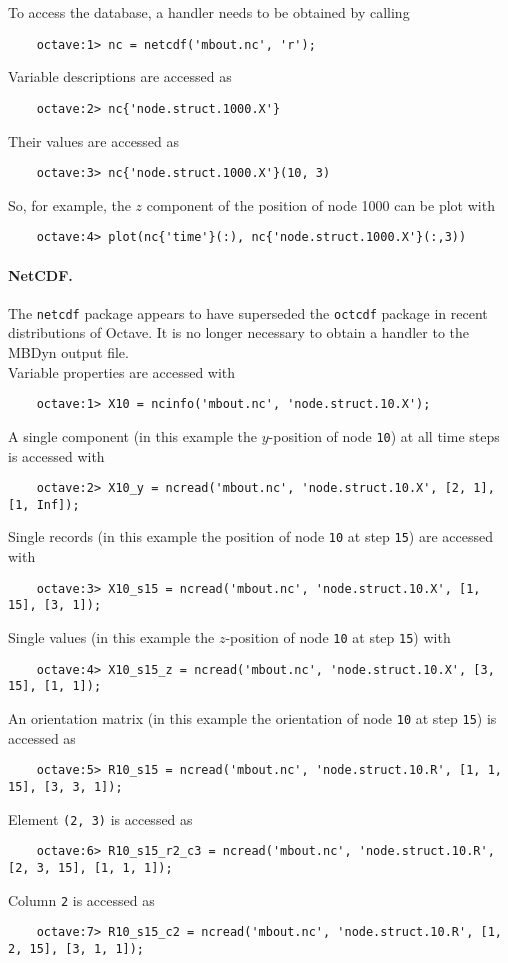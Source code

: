 To access the database, a handler needs to be obtained by calling
\begin{verbatim}
    octave:1> nc = netcdf('mbout.nc', 'r');
\end{verbatim}
Variable descriptions are accessed as
\begin{verbatim}
    octave:2> nc{'node.struct.1000.X'}
\end{verbatim}
Their values are accessed as
\begin{verbatim}
    octave:3> nc{'node.struct.1000.X'}(10, 3)
\end{verbatim}
So, for example, the $z$ component of the position of node 1000 can be plot with 
\begin{verbatim}
    octave:4> plot(nc{'time'}(:), nc{'node.struct.1000.X'}(:,3))
\end{verbatim}

\paragraph{NetCDF.}
The \texttt{netcdf} package appears to have superseded the \texttt{octcdf} package in recent
distributions of Octave. It is no longer necessary to obtain a handler to the MBDyn output file. \\

Variable properties are accessed with
\begin{verbatim}
    octave:1> X10 = ncinfo('mbout.nc', 'node.struct.10.X');
\end{verbatim}
A single component (in this example the $y$-position of node \texttt{10})
at all time steps is accessed with
\begin{verbatim}
    octave:2> X10_y = ncread('mbout.nc', 'node.struct.10.X', [2, 1], [1, Inf]);
\end{verbatim}
Single records (in this example the position of node \texttt{10} at step \texttt{15})
are accessed with
\begin{verbatim}
    octave:3> X10_s15 = ncread('mbout.nc', 'node.struct.10.X', [1, 15], [3, 1]);
\end{verbatim}
Single values (in this example the $z$-position of node \texttt{10} at step \texttt{15}) 
with
\begin{verbatim}
    octave:4> X10_s15_z = ncread('mbout.nc', 'node.struct.10.X', [3, 15], [1, 1]);
\end{verbatim}
An orientation matrix (in this example the orientation of node \texttt{10} at step \texttt{15})
is accessed as
\begin{verbatim}
    octave:5> R10_s15 = ncread('mbout.nc', 'node.struct.10.R', [1, 1, 15], [3, 3, 1]);
\end{verbatim}
Element \texttt{(2, 3)} is accessed as
\begin{verbatim}
    octave:6> R10_s15_r2_c3 = ncread('mbout.nc', 'node.struct.10.R', [2, 3, 15], [1, 1, 1]);
\end{verbatim}
Column \texttt{2} is accessed as
\begin{verbatim}
    octave:7> R10_s15_c2 = ncread('mbout.nc', 'node.struct.10.R', [1, 2, 15], [3, 1, 1]);
\end{verbatim}
